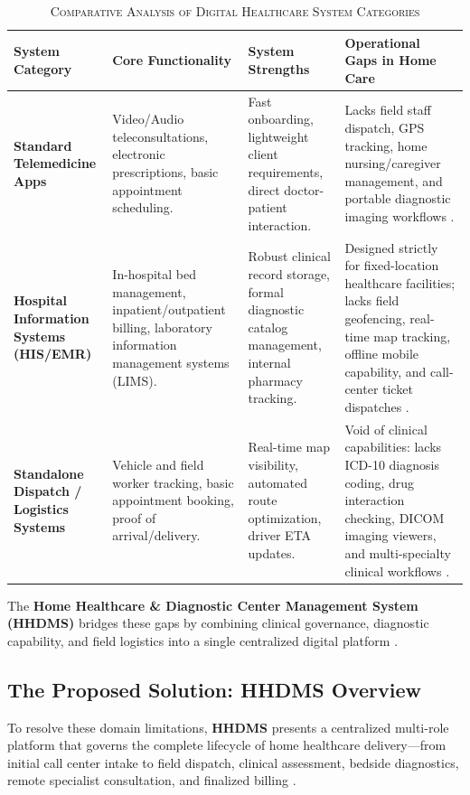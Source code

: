 \documentclass[lettersize,onecolumn,journal]{IEEEtran}
\begin{document}
	\begin{table}[htbp]
		\centering
		\small
		\begin{tabular}{|>{\RaggedRight\arraybackslash}m{2.8cm}|>{\RaggedRight\arraybackslash}m{3.5cm}|>{\RaggedRight\arraybackslash}m{3.5cm}|>{\RaggedRight\arraybackslash}m{4.2cm}|}
			\hline
			\textbf{System Category} & \textbf{Core Functionality} & \textbf{System Strengths} & \textbf{Operational Gaps in Home Care} \\ \hline
			\textbf{Standard Telemedicine Apps} & Video/Audio teleconsultations, electronic prescriptions, basic appointment scheduling. & Fast onboarding, lightweight client requirements, direct doctor-patient interaction. & Lacks field staff dispatch, GPS tracking, home nursing/caregiver management, and portable diagnostic imaging workflows \cite{telemedicine_homecare}. \\ \hline
			\textbf{Hospital Information Systems (HIS/EMR)} & In-hospital bed management, inpatient/outpatient billing, laboratory information management systems (LIMS). & Robust clinical record storage, formal diagnostic catalog management, internal pharmacy tracking. & Designed strictly for fixed-location healthcare facilities; lacks field geofencing, real-time map tracking, offline mobile capability, and call-center ticket dispatches \cite{pacs2001}. \\ \hline
			\textbf{Standalone Dispatch / Logistics Systems} & Vehicle and field worker tracking, basic appointment booking, proof of arrival/delivery. & Real-time map visibility, automated route optimization, driver ETA updates. & Void of clinical capabilities: lacks ICD-10 diagnosis coding, drug interaction checking, DICOM imaging viewers, and multi-specialty clinical workflows \cite{who2016icd10, dicom2021}. \\ \hline
		\end{tabular}
		\vspace{0.5em}
		\caption{\scshape Comparative Analysis of Digital Healthcare System Categories}
		\label{tab:related_work}
	\end{table}
	
	The \textbf{Home Healthcare \& Diagnostic Center Management System (HHDMS)} bridges these gaps by combining clinical governance, diagnostic capability, and field logistics into a single centralized digital platform \cite{srs2026, accv2016}.
	
	\subsection{The Proposed Solution: HHDMS Overview}
	To resolve these domain limitations, \textbf{HHDMS} presents a centralized multi-role platform that governs the complete lifecycle of home healthcare delivery—from initial call center intake to field dispatch, clinical assessment, bedside diagnostics, remote specialist consultation, and finalized billing \cite{srs2026}.
	
\end{document}
